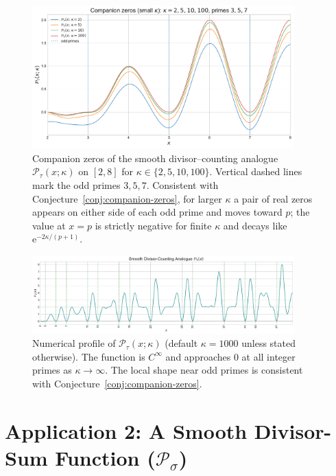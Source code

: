 \documentclass[11pt,a4paper]{amsart}
\theoremstyle{plain}
\theoremstyle{definition}
\theoremstyle{remark}
\begin{document}
\begin{figure}[!htbp]
\centering
\includegraphics[width=0.9\textwidth]{plot_companion_zeros.pdf}
\caption{Companion zeros of the smooth divisor–counting analogue $\mathcal{P}_{\tau}(x;\kappa)$
on $[2,8]$ for $\kappa\in\{2,5,10,100\}$. Vertical dashed lines mark the odd primes $3,5,7$.
Consistent with Conjecture~\ref{conj:companion-zeros}, for larger $\kappa$ a pair of real zeros
appears on either side of each odd prime and moves toward $p$; the value at $x=p$
is strictly negative for finite $\kappa$ and decays like $\mathrm e^{-2\kappa/(p+1)}$.}
\label{fig:PtauCompanions}
\end{figure}

\begin{figure}[!htbp]
\centering
\includegraphics[width=0.9\textwidth]{plot_P_tau.pdf}
\caption{Numerical profile of $\mathcal{P}_{\tau}(x; \kappa)$ (default $\kappa=1000$ unless stated otherwise).
The function is $C^\infty$ and approaches $0$ at all integer primes as $\kappa\to\infty$. The local shape near odd primes is consistent with Conjecture~\ref{conj:companion-zeros}.}
\label{fig:P_tau}
\end{figure}

\FloatBarrier

\section{Application 2: A Smooth Divisor-Sum Function (\texorpdfstring{$\mathcal{P}_{\sigma}$}{P_sigma})}
\end{document}
